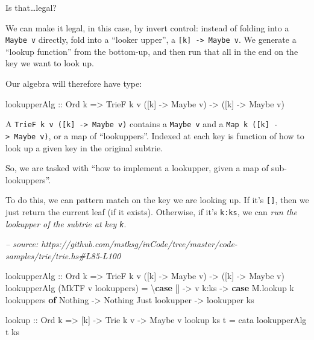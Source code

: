 \documentclass[]{article}
\newenvironment{Shaded}{}{}
\newcommand{\CommentTok}[1]{\textcolor[rgb]{0.38,0.63,0.69}{\textit{#1}}}
\newcommand{\DataTypeTok}[1]{\textcolor[rgb]{0.56,0.13,0.00}{#1}}
\newcommand{\FunctionTok}[1]{\textcolor[rgb]{0.02,0.16,0.49}{#1}}
\newcommand{\KeywordTok}[1]{\textcolor[rgb]{0.00,0.44,0.13}{\textbf{#1}}}
\newcommand{\NormalTok}[1]{#1}
\newcommand{\OtherTok}[1]{\textcolor[rgb]{0.00,0.44,0.13}{#1}}
\begin{document}
Is that\ldots{}legal?

We can make it legal, in this case, by invert control: instead of folding into a
\texttt{Maybe\ v} directly, fold into a ``looker upper'', a
\texttt{{[}k{]}\ -\textgreater{}\ Maybe\ v}. We generate a ``lookup function''
from the bottom-up, and then run that all in the end on the key we want to look
up.

Our algebra will therefore have type:

\begin{Shaded}
\begin{Highlighting}[]
\NormalTok{lookupperAlg}
\OtherTok{    ::} \DataTypeTok{Ord}\NormalTok{ k}
    \OtherTok{=>} \DataTypeTok{TrieF}\NormalTok{ k v ([k] }\OtherTok{->} \DataTypeTok{Maybe}\NormalTok{ v)}
    \OtherTok{->}\NormalTok{ ([k] }\OtherTok{->} \DataTypeTok{Maybe}\NormalTok{ v)}
\end{Highlighting}
\end{Shaded}

A \texttt{TrieF\ k\ v\ ({[}k{]}\ -\textgreater{}\ Maybe\ v)} contains a
\texttt{Maybe\ v} and a \texttt{Map\ k\ ({[}k{]}\ -\textgreater{}\ Maybe\ v)},
or a map of ``lookuppers''. Indexed at each key is function of how to look up a
given key in the original subtrie.

So, we are tasked with ``how to implement a lookupper, given a map of
sub-lookuppers''.

To do this, we can pattern match on the key we are looking up. If it's
\texttt{{[}{]}}, then we just return the current leaf (if it exists). Otherwise,
if it's \texttt{k:ks}, we can \emph{run the lookupper of the subtrie at key
\texttt{k}}.

\begin{Shaded}
\begin{Highlighting}[]
\CommentTok{-- source: https://github.com/mstksg/inCode/tree/master/code-samples/trie/trie.hs#L85-L100}

\NormalTok{lookupperAlg}
\OtherTok{    ::} \DataTypeTok{Ord}\NormalTok{ k}
    \OtherTok{=>} \DataTypeTok{TrieF}\NormalTok{ k v ([k] }\OtherTok{->} \DataTypeTok{Maybe}\NormalTok{ v)}
    \OtherTok{->}\NormalTok{ ([k] }\OtherTok{->} \DataTypeTok{Maybe}\NormalTok{ v)}
\NormalTok{lookupperAlg (}\DataTypeTok{MkTF}\NormalTok{ v lookuppers) }\FunctionTok{=}\NormalTok{ \textbackslash{}}\KeywordTok{case}
\NormalTok{    []   }\OtherTok{->}\NormalTok{ v}
\NormalTok{    k}\FunctionTok{:}\NormalTok{ks }\OtherTok{->} \KeywordTok{case}\NormalTok{ M.lookup k lookuppers }\KeywordTok{of}
      \DataTypeTok{Nothing}        \OtherTok{->} \DataTypeTok{Nothing}
      \DataTypeTok{Just}\NormalTok{ lookupper }\OtherTok{->}\NormalTok{ lookupper ks}

\NormalTok{lookup}
\OtherTok{    ::} \DataTypeTok{Ord}\NormalTok{ k}
    \OtherTok{=>}\NormalTok{ [k]}
    \OtherTok{->} \DataTypeTok{Trie}\NormalTok{ k v}
    \OtherTok{->} \DataTypeTok{Maybe}\NormalTok{ v}
\NormalTok{lookup ks t }\FunctionTok{=}\NormalTok{ cata lookupperAlg t ks}
\end{Highlighting}
\end{Shaded}
\end{document}
